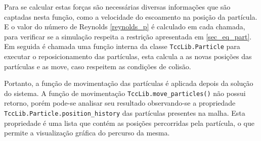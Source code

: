 Para se calcular estas forças são necessárias diversas informações que são captadas nesta função, como a velocidade do escoamento na posição da partícula.
E o valor do número de Reynolds \eqref{reynolds_p} é calculado em cada chamada, para verificar se a simulação respeita a restrição apresentada em \ref{sec_eq_part}.
Em seguida é chamada uma função interna da classe \verb|TccLib.Particle| para executar o reposicionamento das partículas, esta calcula a as novas posições das partículas e as move, caso respeitem as condições de colisão.

Portanto, a função de movimentação das partículas é aplicada depois da solução do sistema.
A função de movimentação \verb|TccLib.move_particles()| não possui retorno, porém pode-se analisar seu resultado observando-se a propriedade \verb|TccLib.Particle.position_history| das partículas presentes na malha.
Esta propriedade é uma lista que contém as posições percorridas pela partícula, o que permite a visualização gráfica do percurso da mesma.